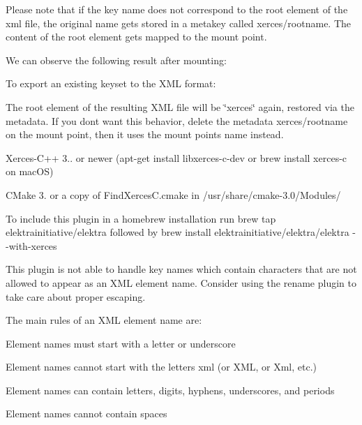 Please note that if the key name does not correspond to the root element of the xml file, the original name gets stored in a metakey called {\ttfamily xerces/rootname}. The content of the root element gets mapped to the mount point.

We can observe the following result after mounting\+:


\begin{DoxyCode}{0}
\end{DoxyCode}


To export an existing keyset to the X\+ML format\+:


\begin{DoxyCode}{0}
\end{DoxyCode}


The root element of the resulting X\+ML file will be \char`\"{}xerces\char`\"{} again, restored via the metadata. If you don\textquotesingle{}t want this behavior, delete the metadata {\ttfamily xerces/rootname} on the mount point, then it uses the mount point\textquotesingle{}s name instead.


\begin{DoxyItemize}
\item {\ttfamily Xerces-\/\+C++ 3..} or newer ({\ttfamily apt-\/get install libxerces-\/c-\/dev} or {\ttfamily brew install xerces-\/c} on mac\+OS)
\item C\+Make 3. or a copy of {\ttfamily Find\+Xerces\+C.\+cmake} in {\ttfamily /usr/share/cmake-\/3.0/\+Modules/}
\end{DoxyItemize}

To include this plugin in a homebrew installation run {\ttfamily brew tap elektrainitiative/elektra} followed by {\ttfamily brew install elektrainitiative/elektra/elektra -\/-\/with-\/xerces}

This plugin is not able to handle key names which contain characters that are not allowed to appear as an X\+ML element name. Consider using the rename plugin to take care about proper escaping.

The main rules of an X\+ML element name are\+:


\begin{DoxyItemize}
\item Element names must start with a letter or underscore
\item Element names cannot start with the letters xml (or X\+ML, or Xml, etc.)
\item Element names can contain letters, digits, hyphens, underscores, and periods
\item Element names cannot contain spaces
\end{DoxyItemize}


